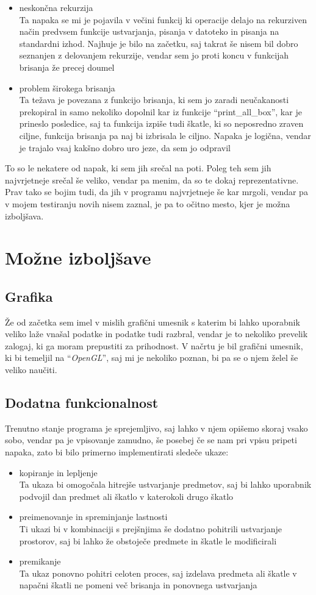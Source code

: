 \documentclass[12pt, a4paper, notitlepage]{article}
\begin{document}
\begin{itemize}
        \item neskončna rekurzija\\ Ta napaka se mi je pojavila v večini funkcij ki operacije delajo na rekurziven način predvsem funkcije ustvarjanja, pisanja v datoteko in pisanja na standardni izhod. Najhuje je bilo na začetku, saj takrat še nisem bil dobro seznanjen z delovanjem rekurzije, vendar sem jo proti koncu v funkcijah brisanja že precej doumel
        \item problem širokega brisanja\\ Ta težava je povezana z funkcijo brisanja, ki sem jo zaradi neučakanosti prekopiral in samo nekoliko dopolnil kar iz funkcije ``print\_all\_box'', kar je prineslo posledice, saj ta funkcija izpiše tudi škatle, ki so neposredno zraven ciljne, funkcija brisanja pa naj bi izbrisala le ciljno. Napaka je logična, vendar je trajalo vsaj kakšno dobro uro jeze, da sem jo odpravil
      \end{itemize}
      To so le nekatere od napak, ki sem jih srečal na poti. Poleg teh sem jih najvrjetneje srečal še veliko, vendar pa menim, da so te dokaj reprezentativne. Prav tako se bojim tudi, da jih v programu najvrjetneje še kar mrgoli, vendar pa v mojem testiranju novih nisem zaznal, je pa to očitno mesto, kjer je možna izboljšava.
  \section{Možne izboljšave}
  \subsection{Grafika}
  Že od začetka sem imel v mislih grafični umesnik s katerim bi lahko uporabnik veliko laže vnašal podatke in podatke tudi razbral, vendar je to nekoliko prevelik zalogaj, ki ga moram prepustiti za prihodnost. V načrtu je bil grafični umesnik, ki bi temeljil na ``\textit{OpenGL}'', saj mi je nekoliko poznan, bi pa se o njem želel še veliko naučiti.
  \subsection{Dodatna funkcionalnost}
  Trenutno stanje programa je sprejemljivo, saj lahko v njem opišemo skoraj vsako sobo, vendar pa je vpisovanje zamudno, še posebej če se nam pri vpisu pripeti napaka, zato bi bilo primerno implementirati sledeče ukaze:
  \begin{itemize}
    \item kopiranje in lepljenje\\ Ta ukaza bi omogočala hitrejše ustvarjanje predmetov, saj bi lahko uporabnik podvojil dan predmet ali škatlo v katerokoli drugo škatlo
    \item preimenovanje in spreminjanje lastnosti\\ Ti ukazi bi v kombinaciji s prejšnjima še dodatno pohitrili ustvarjanje prostorov, saj bi lahko že obstoječe predmete in škatle le modificirali
    \item premikanje\\ Ta ukaz ponovno pohitri celoten proces, saj izdelava predmeta ali škatle v napačni škatli ne pomeni več brisanja in ponovnega ustvarjanja
  \end{itemize}
\end{document}
